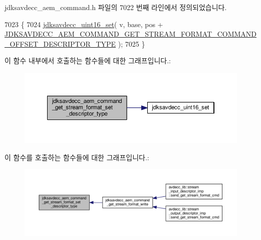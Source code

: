 jdksavdecc\+\_\+aem\+\_\+command.\+h 파일의 7022 번째 라인에서 정의되었습니다.


\begin{DoxyCode}
7023 \{
7024     \hyperlink{group__endian_ga14b9eeadc05f94334096c127c955a60b}{jdksavdecc\_uint16\_set}( v, base, pos + 
      \hyperlink{group__command__get__stream__format_ga596cf49460feaef4da969ff2f9bd5df5}{JDKSAVDECC\_AEM\_COMMAND\_GET\_STREAM\_FORMAT\_COMMAND\_OFFSET\_DESCRIPTOR\_TYPE}
       );
7025 \}
\end{DoxyCode}


이 함수 내부에서 호출하는 함수들에 대한 그래프입니다.\+:
\nopagebreak
\begin{figure}[H]
\begin{center}
\leavevmode
\includegraphics[width=350pt]{group__command__get__stream__format_ga103013fa4032c9507f7794c230d5c16b_cgraph}
\end{center}
\end{figure}




이 함수를 호출하는 함수들에 대한 그래프입니다.\+:
\nopagebreak
\begin{figure}[H]
\begin{center}
\leavevmode
\includegraphics[width=350pt]{group__command__get__stream__format_ga103013fa4032c9507f7794c230d5c16b_icgraph}
\end{center}
\end{figure}


